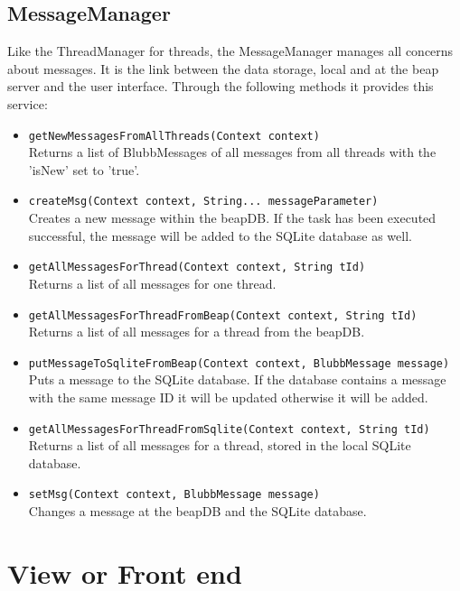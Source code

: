 \documentclass[12pt,a4paper,oneside]{report}
\newcommand{\beapDB}{beapDB}
\newcommand{\beapServer}{beap server}
\newcommand{\code}[1]{\lstinline{#1}}
\begin{document}
\subsection{MessageManager}
Like the ThreadManager for threads, the MessageManager manages all concerns about messages. It is the link between the data storage, local and at the \beapServer{} and the user interface. Through the following methods it provides this service:
\begin{itemize}
\item{\code{getNewMessagesFromAllThreads(Context context)}}\\
Returns a list of BlubbMessages of all messages from all threads with the 'isNew' set to 'true'. 

\item{\code{createMsg(Context context, String... messageParameter)}}\\
 Creates a new message within the \beapDB{}. If the task has been executed successful, the message will be added to the SQLite database as well.
     
\item{\code{getAllMessagesForThread(Context context, String tId)}}\\
Returns a list of all messages for one thread.

\item{\code{getAllMessagesForThreadFromBeap(Context context, String tId)}}\\
Returns a list of all messages for a thread from the \beapDB{}.

\item{\code{putMessageToSqliteFromBeap(Context context, BlubbMessage message)}}\\
 Puts a message to the SQLite database. If the database contains a message with the same message ID it will be updated otherwise it will be added.
     
\item{\code{getAllMessagesForThreadFromSqlite(Context context, String tId)}}\\
Returns a list of all messages for a thread, stored in the local SQLite database.

\item{\code{setMsg(Context context, BlubbMessage message)}}\\
Changes a message at the \beapDB{} and the SQLite database.
\end{itemize}

\section{View or Front end}
\end{document}
